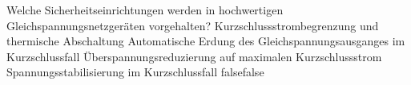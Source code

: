     {Welche Sicherheitseinrichtungen werden in hochwertigen Gleichspannungsnetzgeräten vorgehalten?}
    {Kurzschlussstrombegrenzung und thermische Abschaltung}
    {Automatische Erdung des Gleichspannungsausganges im Kurzschlussfall}
    {Überspannungsreduzierung auf maximalen Kurzschlussstrom}
    {Spannungsstabilisierung im Kurzschlussfall}
    {false}{false}